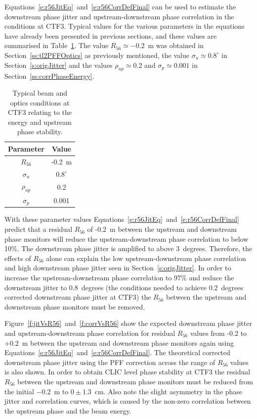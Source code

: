 Equations~\ref{e:r56JitEq}~and~\ref{e:r56CorrDefFinal} can be used to estimate the downstream phase jitter and upstream-downstream phase correlation in the conditions at CTF3. Typical values for the various parameters in the equations have already been presented in previous sections, and these values are summarised in Table~\ref{t:r56Params}. The value \(R_{56}\simeq -0.2\)~m was obtained in Section~\ref{ss:tl2PFFOptics} as previously mentioned, the value \(\sigma_u\simeq0.8^\circ\) in Section~\ref{s:origJitter} and the values \(\rho_{up}\simeq 0.2\) and \(\sigma_p\simeq 0.001\) in Section~\ref{ss:corrPhaseEnergy}.

\begin{table}
  \begin{center}
    \begin{tabular}{| c c |}
	   \hline
       Parameter & Value \\ \hline
       \(R_{56}\) & -0.2~m \\
       \(\sigma_u\) & \(0.8^\circ\) \\
       \(\rho_{up}\) & 0.2 \\
       \(\sigma_{p}\) & 0.001 \\ \hline
    \end{tabular}
    \caption{Typical beam and optics conditions at CTF3 relating to the energy and upstream phase stability.}
  	\label{t:r56Params}
  \end{center}
\end{table}

With these parameter values Equations~\ref{e:r56JitEq}~and~\ref{e:r56CorrDefFinal} predict that a residual \(R_{56}\) of -0.2~m between the upstream and downstream phase monitors will reduce the upstream-downstream phase correlation to below 10\%. The downstream phase jitter is amplified to above 3~degrees. Therefore, the effects of \(R_{56}\) alone can explain the low upstream-downstream phase correlation and high downstream phase jitter seen in Section~\ref{s:origJitter}. In order to increase the upstream-downstream phase correlation to 97\% and reduce the downstream jitter to 0.8~degrees (the conditions needed to achieve 0.2~degrees corrected downstream phase jitter at CTF3) the \(R_{56}\) between the upstream and downstream phase monitors must be removed.

Figure~\ref{f:jitVsR56}~and~\ref{f:corrVsR56} show the expected downstream phase jitter and upstream-downstream phase correlation for residual \(R_{56}\) values from -0.2 to +0.2~m between the upstream and downstream phase monitors again using Equations~\ref{e:r56JitEq}~and~\ref{e:r56CorrDefFinal}. The theoretical corrected downstream phase jitter using the PFF correction across the range of \(R_{56}\) values is also shown. In order to obtain CLIC level phase stability at CTF3 the residual \(R_{56}\) between the upstream and downstream phase monitors must be reduced from the initial \(-0.2\)~m to \(0\pm1.3\)~cm. Also note the slight asymmetry in the phase jitter and correlation curves, which is caused by the non-zero correlation between the upstream phase and the beam energy. 

